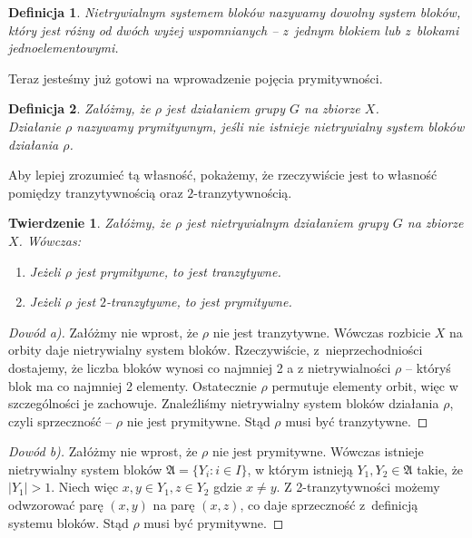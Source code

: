 \documentclass[licencjacka]{pracamgr}
\newtheorem{deff}{Definicja}[section]
\newtheorem{thh}{Twierdzenie}[section]
\begin{document}
\begin{deff}
    \emph{Nietrywialnym systemem bloków} nazywamy dowolny system bloków,
    który jest różny od dwóch wyżej wspomnianych -- z~jednym blokiem lub z~blokami jednoelementowymi.
\end{deff}

Teraz jesteśmy już gotowi na wprowadzenie pojęcia prymitywności.

\begin{deff}
    Załóżmy, że $\rho$ jest działaniem grupy $G$ na zbiorze $X$. \\
    Działanie \emph{$\rho$ nazywamy prymitywnym}, jeśli nie istnieje nietrywialny system bloków działania $\rho$.
\end{deff}

Aby lepiej zrozumieć tą własność, pokażemy, że rzeczywiście jest to
własność pomiędzy tranzytywnością oraz $2$-tranzytywnością.

\begin{thh}
    Załóżmy, że $\rho$ jest nietrywialnym działaniem grupy $G$ na zbiorze $X$. Wówczas:
    \begin{enumerate}[label=\alph*)]
     \item Jeżeli $\rho$ jest prymitywne, to jest tranzytywne.
     \item Jeżeli $\rho$ jest $2$-tranzytywne, to jest prymitywne.
    \end{enumerate}
\end{thh}

\begin{proof}[Dowód a)]
  Załóżmy nie wprost, że $\rho$ nie jest tranzytywne.
                    Wówczas rozbicie $X$ na orbity daje nietrywialny system bloków.
                    Rzeczywiście, z~nieprzechodniości dostajemy, że liczba bloków wynosi co najmniej 2 a
                    z nietrywialności $\rho$ -- któryś blok ma co najmniej 2 elementy.
                    Ostatecznie $\rho$ permutuje elementy orbit, więc w szczególności je zachowuje.
                    Znaleźliśmy nietrywialny system bloków działania $\rho$, czyli sprzeczność -- $\rho$ nie jest prymitywne.
                    Stąd $\rho$ musi być tranzytywne.
\end{proof}
\begin{proof}[Dowód b)]
     Załóżmy nie wprost, że $\rho$ nie jest prymitywne.
                    Wówczas istnieje nietrywialny system bloków $\mathfrak{A} = \{Y_i \colon i \in I \}$,
                    w którym istnieją $Y_1, Y_2 \in \mathfrak{A}$ takie, że $|Y_1| > 1$.
                    Niech więc $x,y \in Y_1, z \in Y_2$ gdzie $x \ne y$.
                    Z 2-tranzytywności możemy odwzorować parę $(x, y)$ na parę $(x, z)$, co daje sprzeczność z~definicją systemu bloków.
                    Stąd $\rho$ musi być prymitywne.
\end{proof}
\end{document}
